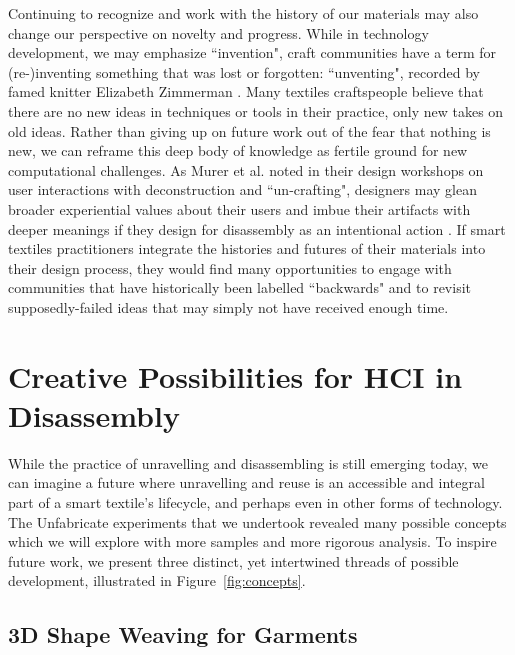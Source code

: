 Continuing to recognize and work with the history of our materials may also change our perspective on novelty and progress. While in technology development, we may emphasize ``invention", craft communities have a term for (re-)inventing something that was lost or forgotten: ``unventing", recorded by famed knitter Elizabeth Zimmerman \cite{zimmermann_almanac_2012}. Many textiles craftspeople believe that there are no new ideas in techniques or tools in their practice, only new takes on old ideas. Rather than giving up on future work out of the fear that nothing is new, we can reframe this deep body of knowledge as fertile ground for new computational challenges. As Murer et al. noted in their design workshops on user interactions with deconstruction and ``un-crafting", designers may glean broader experiential values about their users and imbue their artifacts with deeper meanings if they design for disassembly as an intentional action \cite{Murer:2018:MTA:3196709.3196806, Murer:2017:UDE:3024969.3024993, Murer:2015:DID:2882850.2882860}. If smart textiles practitioners integrate the histories and futures of their materials into their design process, they would find many opportunities to engage with communities that have historically been labelled ``backwards" and to revisit supposedly-failed ideas that may simply not have received enough time.


\section{Creative Possibilities for HCI in Disassembly} 
While the practice of unravelling and disassembling is still emerging today, we can imagine a future where unravelling and reuse is an accessible and integral part of a smart textile's lifecycle, and perhaps even in other forms of technology. The Unfabricate experiments that we undertook revealed many possible concepts which we will explore with more samples and more rigorous analysis. To inspire future work, we present three distinct, yet intertwined threads of possible development, illustrated in Figure~\ref{fig:concepts}.

\subsection{3D Shape Weaving for Garments}

